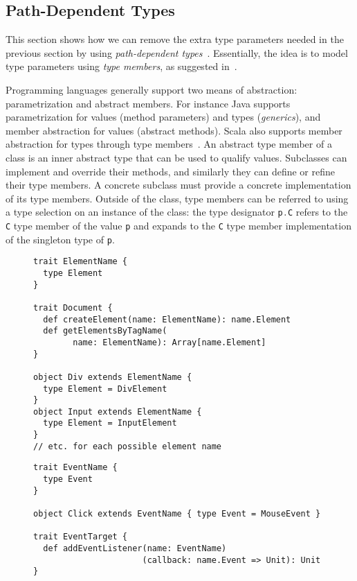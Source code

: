 \documentclass{llncs}
\newcommand{\jscode}[1]{\lstinline[language=JavaScript]|#1|}
\newcommand{\scalacode}[1]{\lstinline[language=Scala]|#1|}
\begin{document}
\subsection{Path-Dependent Types}

This section shows how we can remove the extra type parameters needed in the previous section by using \emph{path-dependent types}~\cite{Odersky03_vObj}. Essentially, the idea is to model type parameters using \emph{type members}, as suggested in~\cite{odersky2005scalable}.

Programming languages generally support two means of abstraction: parametrization and abstract members. For instance Java supports parametrization for values (method parameters) and types (\emph{generics}), and member abstraction for values (abstract methods). Scala also supports member abstraction for types through type members~\cite{cremet2006core,Odersky03_vObj}. An abstract type member of a class is an inner abstract type that can be used to qualify values. Subclasses can implement and override their methods, and similarly they can define or refine their type members. A concrete subclass must provide a concrete implementation of its type members. Outside of the class, type members can be referred to using a type selection on an instance of the class: the type designator \scalacode{p.C} refers to the \scalacode{C} type member of the value \scalacode{p} and expands to the \scalacode{C} type member implementation of the singleton type of \scalacode{p}.

\begin{figure}
\begin{lstlisting}[label=lst-dt-dom,caption={Encoding of \jscode{createElement} using path-dependent types}]
trait ElementName {
  type Element
}

trait Document {
  def createElement(name: ElementName): name.Element
  def getElementsByTagName(
        name: ElementName): Array[name.Element]
}

object Div extends ElementName {
  type Element = DivElement
}
object Input extends ElementName {
  type Element = InputElement
}
// etc. for each possible element name
\end{lstlisting}
\end{figure}

\begin{figure}
\begin{lstlisting}[label=lst-dt-events,caption={Encoding of \jscode{addEventListener} using path-dependent types}]
trait EventName {
  type Event
}

object Click extends EventName { type Event = MouseEvent }

trait EventTarget {
  def addEventListener(name: EventName)
                      (callback: name.Event => Unit): Unit
}
\end{lstlisting}
\end{figure}
\end{document}
